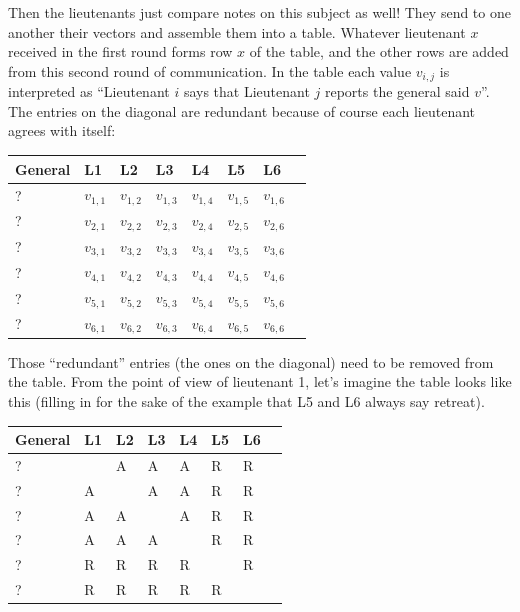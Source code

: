 \documentclass[a4paper]{report}
\begin{document}
Then the lieutenants just compare notes on this subject as well! They send to one another their vectors and assemble them into a table. Whatever lieutenant $x$ received in the first round forms row $x$ of the table, and the other rows are added from this second round of communication. In the table each value $v_{i,j}$ is interpreted as ``Lieutenant $i$ says that Lieutenant $j$ reports the general said $v$''. The entries on the diagonal are redundant because of course each lieutenant agrees with itself:

\begin{center}
	\begin{tabular}{|l|l|l|l|l|l|l|l|}
		\hline
		General & L1        & L2        & L3        & L4        & L5        & L6        \\
		\hline
		?       & $v_{1,1}$ & $v_{1,2}$ & $v_{1,3}$ & $v_{1,4}$ & $v_{1,5}$ & $v_{1,6}$ \\\hline
		?       & $v_{2,1}$ & $v_{2,2}$ & $v_{2,3}$ & $v_{2,4}$ & $v_{2,5}$ & $v_{2,6}$ \\\hline
		?       & $v_{3,1}$ & $v_{3,2}$ & $v_{3,3}$ & $v_{3,4}$ & $v_{3,5}$ & $v_{3,6}$ \\\hline
		?       & $v_{4,1}$ & $v_{4,2}$ & $v_{4,3}$ & $v_{4,4}$ & $v_{4,5}$ & $v_{4,6}$ \\\hline
		?       & $v_{5,1}$ & $v_{5,2}$ & $v_{5,3}$ & $v_{5,4}$ & $v_{5,5}$ & $v_{5,6}$ \\\hline
		?       & $v_{6,1}$ & $v_{6,2}$ & $v_{6,3}$ & $v_{6,4}$ & $v_{6,5}$ & $v_{6,6}$ \\\hline
	\end{tabular}
\end{center}

Those ``redundant'' entries (the ones on the diagonal) need to be removed from the table. From the point of view of lieutenant 1, let's imagine the table looks like this (filling in for the sake of the example that L5 and L6 always say retreat).
\begin{center}
	\begin{tabular}{|l|l|l|l|l|l|l|l|}
		\hline
		General & L1 & L2 & L3 & L4 & L5 & L6 \\
		\hline
		?       & ~  & A  & A  & A  & R  & R  \\ \hline
		?       & A  & ~  & A  & A  & R  & R  \\ \hline
		?       & A  & A  & ~  & A  & R  & R  \\ \hline
		?       & A  & A  & A  & ~  & R  & R  \\ \hline
		?       & R  & R  & R  & R  & ~  & R  \\ \hline
		?       & R  & R  & R  & R  & R  & ~  \\ \hline
	\end{tabular}
\end{center}
\end{document}
